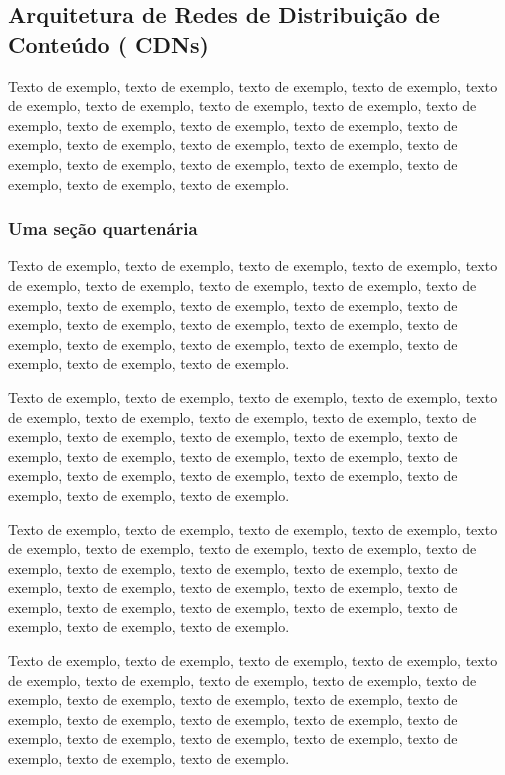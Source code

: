 \documentclass[
	12pt,				%
	oneside,			%
	a4paper,			%
	english,			%
	brazil				%
	]{abntex2ppgsi}
\begin{document}
\subsection{Arquitetura de Redes de Distribuição de Conteúdo ( CDNs)}

Texto de exemplo, texto de exemplo, texto de exemplo, texto de exemplo, texto de exemplo, texto de exemplo, texto de exemplo, texto de exemplo, texto de exemplo, texto de exemplo, texto de exemplo, texto de exemplo, texto de exemplo, texto de exemplo, texto de exemplo, texto de exemplo, texto de exemplo, texto de exemplo, texto de exemplo, texto de exemplo, texto de exemplo, texto de exemplo, texto de exemplo.

\subsubsection{Uma seção quartenária}

Texto de exemplo, texto de exemplo, texto de exemplo, texto de exemplo, texto de exemplo, texto de exemplo, texto de exemplo, texto de exemplo, texto de exemplo, texto de exemplo, texto de exemplo, texto de exemplo, texto de exemplo, texto de exemplo, texto de exemplo, texto de exemplo, texto de exemplo, texto de exemplo, texto de exemplo, texto de exemplo, texto de exemplo, texto de exemplo, texto de exemplo.


Texto de exemplo, texto de exemplo, texto de exemplo, texto de exemplo, texto de exemplo, texto de exemplo, texto de exemplo, texto de exemplo, texto de exemplo, texto de exemplo, texto de exemplo, texto de exemplo, texto de exemplo, texto de exemplo, texto de exemplo, texto de exemplo, texto de exemplo, texto de exemplo, texto de exemplo, texto de exemplo, texto de exemplo, texto de exemplo, texto de exemplo.


Texto de exemplo, texto de exemplo, texto de exemplo, texto de exemplo, texto de exemplo, texto de exemplo, texto de exemplo, texto de exemplo, texto de exemplo, texto de exemplo, texto de exemplo, texto de exemplo, texto de exemplo, texto de exemplo, texto de exemplo, texto de exemplo, texto de exemplo, texto de exemplo, texto de exemplo, texto de exemplo, texto de exemplo, texto de exemplo, texto de exemplo.


Texto de exemplo, texto de exemplo, texto de exemplo, texto de exemplo, texto de exemplo, texto de exemplo, texto de exemplo, texto de exemplo, texto de exemplo, texto de exemplo, texto de exemplo, texto de exemplo, texto de exemplo, texto de exemplo, texto de exemplo, texto de exemplo, texto de exemplo, texto de exemplo, texto de exemplo, texto de exemplo, texto de exemplo, texto de exemplo, texto de exemplo.
\end{document}
